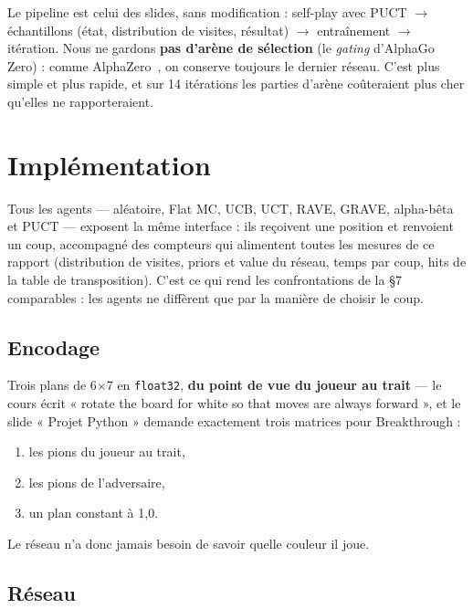 \documentclass[11pt,a4paper]{article}
\begin{document}
Le pipeline est celui des slides, sans modification : self-play avec PUCT $\rightarrow$
échantillons (état, distribution de visites, résultat) $\rightarrow$ entraînement $\rightarrow$ itération.
Nous ne gardons \textbf{pas d'arène de sélection} (le \emph{gating} d'AlphaGo Zero) : comme
AlphaZero~\cite{silver2018}, on conserve toujours le dernier réseau. C'est plus simple et plus
rapide, et sur 14 itérations les parties d'arène coûteraient plus cher qu'elles ne
rapporteraient.

\section{Implémentation}\label{impluxe9mentation}

Tous les agents --- aléatoire, Flat MC, UCB, UCT, RAVE, GRAVE, alpha-bêta et PUCT ---
exposent la même interface : ils reçoivent une position et renvoient un coup,
accompagné des compteurs qui alimentent toutes les mesures de ce rapport
(distribution de visites, priors et value du réseau, temps par coup, hits de la
table de transposition). C'est ce qui rend les confrontations de la §7 comparables :
les agents ne diffèrent que par la manière de choisir le coup.

\subsection{Encodage}\label{encodage}

Trois plans de 6$\times$7 en \texttt{float32}, \textbf{du point de vue du joueur au trait} --- le
cours écrit « rotate the board for white so that moves are always forward », et le
slide « Projet Python » demande exactement trois matrices pour Breakthrough :

\begin{enumerate}
\def\labelenumi{\arabic{enumi}.}
\setlength{\itemsep}{1pt}\setlength{\parskip}{0pt}
\item
  les pions du joueur au trait,
\item
  les pions de l'adversaire,
\item
  un plan constant à 1,0.
\end{enumerate}

Le réseau n'a donc jamais besoin de savoir quelle couleur il joue.

\subsection{Réseau}\label{ruxe9seau}
\end{document}

